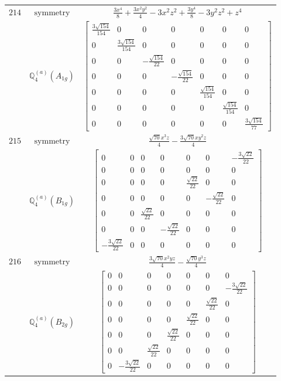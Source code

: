 \documentclass[fleqn,8pt,landscape]{jsarticle}
\begin{document}
\begin{longtable}{ccc}
$ 214 $ & $ \text{symmetry} $ & $ \frac{3 x^{4}}{8} + \frac{3 x^{2} y^{2}}{4} - 3 x^{2} z^{2} + \frac{3 y^{4}}{8} - 3 y^{2} z^{2} + z^{4} $ \\
$  $ & $ \mathbb{Q}_{4}^{(a)}(A_{1g}) $ & $ \begin{bmatrix} \frac{3 \sqrt{154}}{154} & 0 & 0 & 0 & 0 & 0 & 0 \\ 0 & \frac{3 \sqrt{154}}{154} & 0 & 0 & 0 & 0 & 0 \\ 0 & 0 & - \frac{\sqrt{154}}{22} & 0 & 0 & 0 & 0 \\ 0 & 0 & 0 & - \frac{\sqrt{154}}{22} & 0 & 0 & 0 \\ 0 & 0 & 0 & 0 & \frac{\sqrt{154}}{154} & 0 & 0 \\ 0 & 0 & 0 & 0 & 0 & \frac{\sqrt{154}}{154} & 0 \\ 0 & 0 & 0 & 0 & 0 & 0 & \frac{3 \sqrt{154}}{77} \end{bmatrix} $ \\ \hline
$ 215 $ & $ \text{symmetry} $ & $ \frac{\sqrt{70} x^{3} z}{4} - \frac{3 \sqrt{70} x y^{2} z}{4} $ \\
$  $ & $ \mathbb{Q}_{4}^{(a)}(B_{1g}) $ & $ \begin{bmatrix} 0 & 0 & 0 & 0 & 0 & 0 & - \frac{3 \sqrt{22}}{22} \\ 0 & 0 & 0 & 0 & 0 & 0 & 0 \\ 0 & 0 & 0 & 0 & \frac{\sqrt{22}}{22} & 0 & 0 \\ 0 & 0 & 0 & 0 & 0 & - \frac{\sqrt{22}}{22} & 0 \\ 0 & 0 & \frac{\sqrt{22}}{22} & 0 & 0 & 0 & 0 \\ 0 & 0 & 0 & - \frac{\sqrt{22}}{22} & 0 & 0 & 0 \\ - \frac{3 \sqrt{22}}{22} & 0 & 0 & 0 & 0 & 0 & 0 \end{bmatrix} $ \\ \hline
$ 216 $ & $ \text{symmetry} $ & $ \frac{3 \sqrt{70} x^{2} y z}{4} - \frac{\sqrt{70} y^{3} z}{4} $ \\
$  $ & $ \mathbb{Q}_{4}^{(a)}(B_{2g}) $ & $ \begin{bmatrix} 0 & 0 & 0 & 0 & 0 & 0 & 0 \\ 0 & 0 & 0 & 0 & 0 & 0 & - \frac{3 \sqrt{22}}{22} \\ 0 & 0 & 0 & 0 & 0 & \frac{\sqrt{22}}{22} & 0 \\ 0 & 0 & 0 & 0 & \frac{\sqrt{22}}{22} & 0 & 0 \\ 0 & 0 & 0 & \frac{\sqrt{22}}{22} & 0 & 0 & 0 \\ 0 & 0 & \frac{\sqrt{22}}{22} & 0 & 0 & 0 & 0 \\ 0 & - \frac{3 \sqrt{22}}{22} & 0 & 0 & 0 & 0 & 0 \end{bmatrix} $ \\ \hline

\end{longtable}
\end{document}
